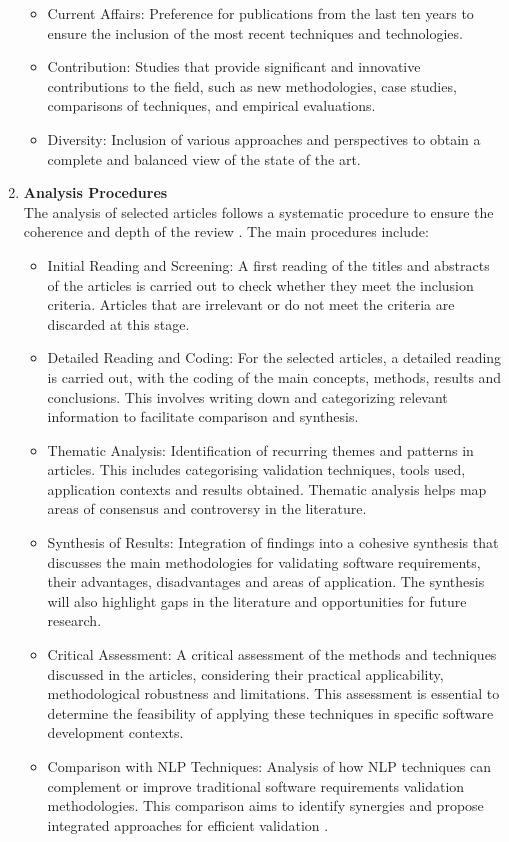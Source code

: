 \begin{enumerate}
\begin{itemize}
 \item Current Affairs: Preference for publications from the last ten years to ensure the inclusion of the most recent techniques and technologies.
 \item Contribution: Studies that provide significant and innovative contributions to the field, such as new methodologies, case studies, comparisons of techniques, and empirical evaluations.
 \item Diversity: Inclusion of various approaches and perspectives to obtain a complete and balanced view of the state of the art.
\end{itemize}
\item \textbf{Analysis Procedures}\\
The analysis of selected articles follows a systematic procedure to ensure the coherence and depth of the review \cite{webster2002analyzing}. The main procedures include:
\begin{itemize}
 \item Initial Reading and Screening: A first reading of the titles and abstracts of the articles is carried out to check whether they meet the inclusion criteria. Articles that are irrelevant or do not meet the criteria are discarded at this stage.
 \item Detailed Reading and Coding: For the selected articles, a detailed reading is carried out, with the coding of the main concepts, methods, results and conclusions. This involves writing down and categorizing relevant information to facilitate comparison and synthesis.
 \item Thematic Analysis: Identification of recurring themes and patterns in articles. This includes categorising validation techniques, tools used, application contexts and results obtained. Thematic analysis helps map areas of consensus and controversy in the literature.
 \item Synthesis of Results: Integration of findings into a cohesive synthesis that discusses the main methodologies for validating software requirements, their advantages, disadvantages and areas of application. The synthesis will also highlight gaps in the literature and opportunities for future research.
 \item Critical Assessment: A critical assessment of the methods and techniques discussed in the articles, considering their practical applicability, methodological robustness and limitations. This assessment is essential to determine the feasibility of applying these techniques in specific software development contexts.
\item Comparison with NLP Techniques: Analysis of how NLP techniques can complement or improve traditional software requirements validation methodologies. This comparison aims to identify synergies and propose integrated approaches for efficient validation \cite{Alamelu2021}.
\end{itemize}
\end{enumerate}